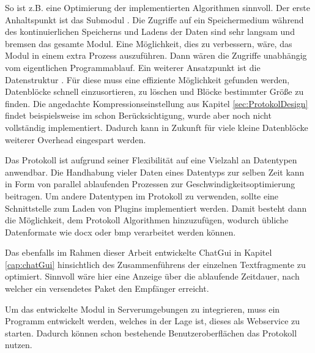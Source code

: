So ist z.B. eine Optimierung der implementierten Algorithmen sinnvoll.
Der erste Anhaltspunkt ist das Submodul .
Die Zugriffe auf ein Speichermedium während des kontinuierlichen Speicherns und
Ladens der Daten sind sehr langsam und bremsen das gesamte Modul. Eine Möglichkeit, dies zu
verbessern, wäre, das Modul in einem extra Prozess auszuf{\"u}hren. Dann wären
die Zugriffe unabhängig vom eigentlichen Programmablauf. Ein weiterer
Ansatzpunkt ist die Datenstruktur . Für diese muss
eine effiziente Möglichkeit gefunden werden, Datenblöcke schnell einzusortieren,
zu löschen und Bl{\"o}cke bestimmter Größe zu finden.
Die angedachte Kompressionseinstellung aus Kapitel \ref{sec:ProtokolDesign}
findet beispielsweise im  schon Berücksichtigung, wurde aber
noch nicht vollständig implementiert. Dadurch kann in Zukunft für viele kleine
Datenblöcke weiterer Overhead eingespart werden.

Das Protokoll ist aufgrund seiner Flexibilität auf eine Vielzahl an Datentypen
anwendbar. Die Handhabung vieler Daten eines Datentyps zur selben Zeit kann
in Form von parallel ablaufenden Prozessen zur Geschwindigkeitsoptimierung
beitragen. Um andere Datentypen im Protokoll zu verwenden, sollte eine
Schnittstelle zum Laden von Plugins implementiert werden. Damit besteht dann die
Möglichkeit, dem Protokoll Algorithmen hinzuzufügen, wodurch
übliche Datenformate wie docx oder bmp verarbeitet werden können.

Das ebenfalls im Rahmen dieser Arbeit entwickelte ChatGui in Kapitel
\ref{cap:chatGui} hinsichtlich des Zusammenführens der einzelnen Textfragmente
zu optimiert. Sinnvoll wäre hier eine Anzeige über die ablaufende Zeitdauer,
nach welcher ein versendetes Paket den Empfänger erreicht.

Um das entwickelte Modul in Serverumgebungen zu integrieren, muss ein Programm
entwickelt werden, welches in der Lage ist, dieses als Webservice zu starten.
Dadurch können schon bestehende Benutzeroberflächen das Protokoll nutzen.
